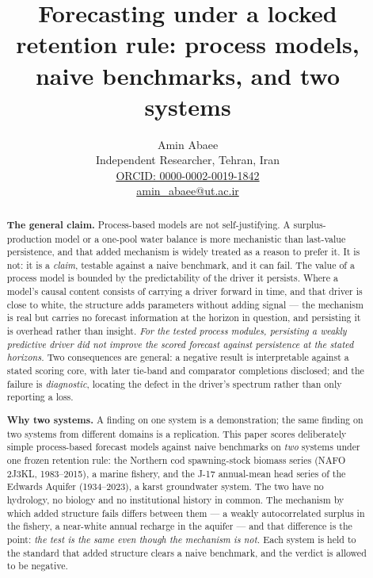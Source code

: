 \documentclass[11pt]{article}
\begin{document}
\title{Forecasting under a locked retention rule: process models, naive benchmarks, and two systems}
\author{Amin Abaee\\[0.35em]
{\small Independent Researcher, Tehran, Iran}\\[0.55em]
{\small\href{https://orcid.org/0000-0002-0019-1842}{ORCID: 0000-0002-0019-1842}}\\[0.3em]
{\small\href{mailto:amin\_abaee@ut.ac.ir}{amin\_abaee@ut.ac.ir}}}
\maketitle
\begin{abstract}
\noindent\textbf{The general claim.} Process-based models are not self-justifying. A surplus-production
model or a one-pool water balance is more mechanistic than last-value persistence, and that added
mechanism is widely treated as a reason to prefer it. It is not: it is a \emph{claim}, testable
against a naive benchmark, and it can fail. The value of a process model is bounded by the
predictability of the driver it persists. Where a model's causal content consists of carrying a
driver forward in time, and that driver is close to white, the structure adds parameters without
adding signal --- the mechanism is real but carries no forecast information at the horizon in
question, and persisting it is overhead rather than insight. \emph{For the tested process modules, persisting a weakly predictive driver did not
improve the scored forecast against persistence at the stated horizons.} Two
consequences are general: a negative result is interpretable against a stated scoring core,
with later tie-band and comparator completions disclosed; and the failure is \emph{diagnostic}, locating the defect in
the driver's spectrum rather than only reporting a loss.

\noindent\textbf{Why two systems.} A finding on one system is a demonstration; the same finding on
two systems from different domains is a replication. This paper scores deliberately simple
process-based forecast models against naive benchmarks on \emph{two} systems under one frozen
retention rule: the Northern cod spawning-stock biomass series (NAFO 2J3KL, 1983--2015), a marine
fishery, and the J-17 annual-mean head series of the Edwards Aquifer (1934--2023), a karst
groundwater system. The two have no hydrology, no biology and no institutional history in common.
The mechanism by which added structure fails differs between them --- a weakly autocorrelated
surplus in the fishery, a near-white annual recharge in the aquifer --- and that difference is the
point: \emph{the test is the same even though the mechanism is not.} Each system is held to the
standard that added structure clears a naive benchmark, and the verdict is allowed to be negative.


\end{abstract}
\end{document}
